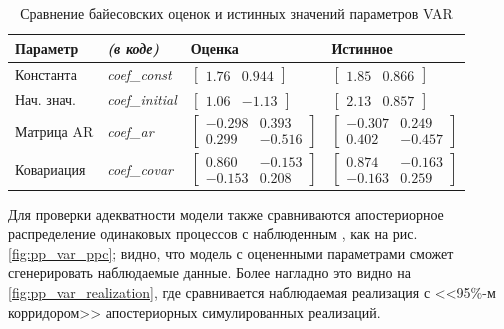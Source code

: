 \documentclass[a4paper,14pt]{extreport}
\begin{document}
\begin{table}[H]
	\begin{tabular}{ll|ll}
		\textbf{Параметр} & \textit{\textbf{(в коде)}} & \textbf{Оценка}              & \textbf{Истинное}            \\ \hline
		Константа         & \textit{coef\_const}       & $\begin{bmatrix} 1.76 & 0.944 \end{bmatrix}$ & $\begin{bmatrix} 1.85 & 0.866 \end{bmatrix}$ \\
		Нач. знач.        & \textit{coef\_initial}     & $\begin{bmatrix} 1.06 & -1.13 \end{bmatrix}$ & $\begin{bmatrix} 2.13 & 0.857 \end{bmatrix}$ \\
		Матрица AR        & \textit{coef\_ar}          & $\begin{bmatrix} -0.298 & 0.393 \\ 0.299 & -0.516 \end{bmatrix}$ & $\begin{bmatrix} -0.307 & 0.249 \\ 0.402 & -0.457 \end{bmatrix}$ \\
		Ковариация        & \textit{coef\_covar}       & $\begin{bmatrix} 0.860 & -0.153 \\ -0.153 & 0.208 \end{bmatrix}$ & $\begin{bmatrix} 0.874 & -0.163 \\ -0.163 & 0.259 \end{bmatrix}$ \\ \hline
	\end{tabular}
	\caption{Сравнение байесовских оценок и истинных значений параметров VAR}
	\label{tbl:pp_var_param_comparison}
\end{table}


Для проверки адекватности модели также сравниваются апостериорное распределение одинаковых процессов с наблюденным \cite{stan_user_guide, arviz_2019}, как на рис. \ref{fig:pp_var_ppc}; видно, что модель с оцененными параметрами сможет сгенерировать наблюдаемые данные. Более нагладно это видно на \ref{fig:pp_var_realization}, где сравнивается наблюдаемая реализация с <<95\%-м корридором>> апостериорных симулированных реализаций. 
\end{document}
